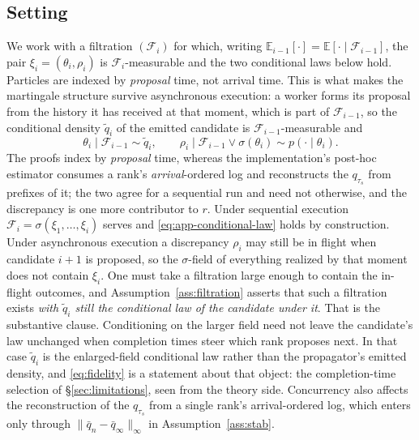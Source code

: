 \documentclass[pdflatex,sn-mathphys-num]{sn-jnl}
\theoremstyle{plain}
\theoremstyle{definition}
\begin{document}
\begin{appendices}
\subsection{Setting}\label{app:theory-setting}
We work with a filtration $(\mathcal{F}_i)$ for which, writing $\mathbb{E}_{i-1}[\cdot]=\mathbb{E}[\cdot\mid\mathcal{F}_{i-1}]$, the pair $\xi_i=(\theta_i,\rho_i)$ is $\mathcal{F}_i$-measurable and the two conditional laws below hold. Particles are indexed by \emph{proposal} time, not arrival time. This is what makes the martingale structure survive asynchronous execution: a worker forms its proposal from the history it has received at that moment, which is part of $\mathcal{F}_{i-1}$, so the conditional density $\tilde q_i$ of the emitted candidate is $\mathcal{F}_{i-1}$-measurable and
\begin{equation}
\theta_i\mid\mathcal{F}_{i-1}\sim \tilde q_i,
\qquad
\rho_i\mid\mathcal{F}_{i-1}\vee\sigma(\theta_i)\sim p(\cdot\mid\theta_i).
\label{eq:app-conditional-law}
\end{equation}
The proofs index by \emph{proposal} time, whereas the implementation's post-hoc estimator consumes a rank's \emph{arrival}-ordered log and reconstructs the $q_{\tau_s}$ from prefixes of it; the two agree for a sequential run and need not otherwise, and the discrepancy is one more contributor to $r$. Under sequential execution $\mathcal{F}_i=\sigma(\xi_1,\dots,\xi_i)$ serves and \eqref{eq:app-conditional-law} holds by construction. Under asynchronous execution a discrepancy $\rho_i$ may still be in flight when candidate $i+1$ is proposed, so the $\sigma$-field of everything realized by that moment does not contain $\xi_i$. One must take a filtration large enough to contain the in-flight outcomes, and Assumption~\ref{ass:filtration} asserts that such a filtration exists \emph{with $\tilde q_i$ still the conditional law of the candidate under it}. That is the substantive clause. Conditioning on the larger field need not leave the candidate's law unchanged when completion times steer which rank proposes next. In that case $\tilde q_i$ is the enlarged-field conditional law rather than the propagator's emitted density, and \eqref{eq:fidelity} is a statement about that object: the completion-time selection of \S\ref{sec:limitations}, seen from the theory side. Concurrency also affects the reconstruction of the $q_{\tau_s}$ from a single rank's arrival-ordered log, which enters only through $\|\bar q_n-\bar q_\infty\|_\infty$ in Assumption~\ref{ass:stab}.


\end{appendices}
\end{document}
